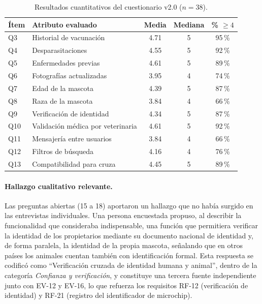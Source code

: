 \documentclass[journal,onecolumn]{IEEEtran}
\begin{document}
	\begin{table}[H]
		\centering
		\caption{Resultados cuantitativos del cuestionario v2.0 ($n = 38$).}
		\label{tab:cuestionario-resultados}
		\small
		\begin{tabularx}{\textwidth}{@{}l X c c c@{}}
			\toprule
			\textbf{Ítem} & \textbf{Atributo evaluado} & \textbf{Media} & \textbf{Mediana} & \textbf{\% $\geq 4$} \\
			\midrule
			
			Q3 & Historial de vacunación & 4.71 & 5 & 95\,\% \\
			
			Q4 & Desparasitaciones & 4.55 & 5 & 92\,\% \\
			
			Q5 & Enfermedades previas & 4.61 & 5 & 89\,\% \\
			
			Q6 & Fotografías actualizadas & 3.95 & 4 & 74\,\% \\
			
			Q7 & Edad de la mascota & 4.39 & 5 & 87\,\% \\
			
			Q8 & Raza de la mascota & 3.84 & 4 & 66\,\% \\
			
			Q9 & Verificación de identidad & 4.34 & 5 & 87\,\% \\
			
			Q10 & Validación médica por veterinaria & 4.61 & 5 & 92\,\% \\
			
			Q11 & Mensajería entre usuarios & 3.84 & 4 & 66\,\% \\
			
			Q12 & Filtros de búsqueda & 4.16 & 4 & 76\,\% \\
			
			Q13 & Compatibilidad para cruza & 4.45 & 5 & 89\,\% \\
			
			\bottomrule
		\end{tabularx}
	\end{table}
	
	\paragraph{Hallazgo cualitativo relevante.}
	Las preguntas abiertas (15 a 18) aportaron un hallazgo que no había surgido
	en las entrevistas individuales. Una persona encuestada propuso, al describir
	la funcionalidad que consideraba indispensable, una función que permitiera
	verificar la identidad de los propietarios mediante su documento nacional de
	identidad y, de forma paralela, la identidad de la propia mascota, señalando
	que en otros países los animales cuentan también con identificación formal.
	Esta respuesta se codificó como \enquote{Verificación cruzada de identidad
		humana y animal}, dentro de la categoría \emph{Confianza y verificación}, y
	constituye una tercera fuente independiente junto con EV-12 y EV-16, lo que
	refuerza los requisitos RF-12 (verificación de identidad) y RF-21 (registro
	del identificador de microchip).
	
\end{document}
